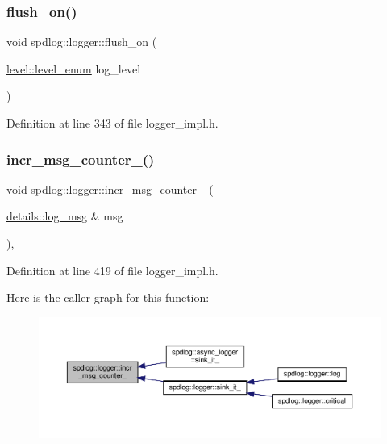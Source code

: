 \subsubsection{\texorpdfstring{flush\+\_\+on()}{flush\_on()}}
{\footnotesize\ttfamily void spdlog\+::logger\+::flush\+\_\+on (\begin{DoxyParamCaption}\item[{\hyperlink{namespacespdlog_1_1level_a35f5227e5daf228d28a207b7b2aefc8b}{level\+::level\+\_\+enum}}]{log\+\_\+level }\end{DoxyParamCaption})\hspace{0.3cm}{\ttfamily [inline]}}



Definition at line 343 of file logger\+\_\+impl.\+h.

\mbox{\label{classspdlog_1_1logger_a55bf9c5c960391a56399b5f1ea601b4b}} 
\subsubsection{\texorpdfstring{incr\+\_\+msg\+\_\+counter\+\_\+()}{incr\_msg\_counter\_()}}
{\footnotesize\ttfamily void spdlog\+::logger\+::incr\+\_\+msg\+\_\+counter\+\_\+ (\begin{DoxyParamCaption}\item[{\hyperlink{structspdlog_1_1details_1_1log__msg}{details\+::log\+\_\+msg} \&}]{msg }\end{DoxyParamCaption})\hspace{0.3cm}{\ttfamily [inline]}, {\ttfamily [protected]}}



Definition at line 419 of file logger\+\_\+impl.\+h.

Here is the caller graph for this function\+:
\nopagebreak
\begin{figure}[H]
\begin{center}
\leavevmode
\includegraphics[width=350pt]{classspdlog_1_1logger_a55bf9c5c960391a56399b5f1ea601b4b_icgraph}
\end{center}
\end{figure}
\mbox{\label{classspdlog_1_1logger_a72f80c2e379df565c628adab1efdab34}} 

